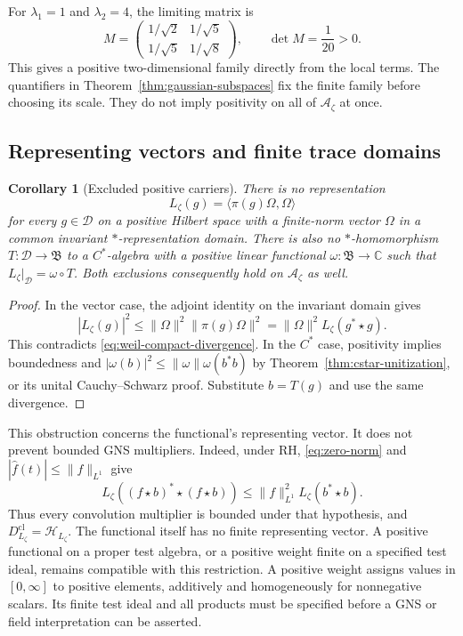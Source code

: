 \documentclass[11pt]{article}
\newtheorem{corollary}[theorem]{Corollary}
\theoremstyle{definition}
\theoremstyle{remark}
\numberwithin{equation}{section}
\newcommand{\cA}{\mathcal A}
\newcommand{\C}{\mathbb C}
\begin{document}
For $\lambda_1=1$ and $\lambda_2=4$, the limiting matrix is
\[
 M=\begin{pmatrix}1/\sqrt2&1/\sqrt5\\1/\sqrt5&1/\sqrt8\end{pmatrix},
 \qquad\det M=\frac1{20}>0.
\]
This gives a positive two-dimensional family directly from the local terms.
The quantifiers in Theorem~\ref{thm:gaussian-subspaces} fix the finite family
before choosing its scale.  They do not imply positivity on all of
$\cA_\zeta$ at once.

\subsection{Representing vectors and finite trace domains}

\begin{corollary}[Excluded positive carriers]
\label{cor:weil-carriers}
There is no representation
\[
 L_\zeta(g)=\langle\pi(g)\Omega,\Omega\rangle
\]
for every $g\in\mathscr D$ on a positive Hilbert space with a finite-norm
vector $\Omega$ in a common invariant $*$-representation domain.
There is also no $*$-homomorphism $T:\mathscr D\to\mathfrak B$ to a
$C^*$-algebra with a positive linear functional
$\omega:\mathfrak B\to\C$ such that $L_\zeta|_{\mathscr D}=\omega\circ T$.
Both exclusions consequently hold on $\cA_\zeta$ as well.
\end{corollary}

\begin{proof}
In the vector case, the adjoint identity on the invariant domain gives
\[
 |L_\zeta(g)|^2
 \leq\|\Omega\|^2\|\pi(g)\Omega\|^2
 =\|\Omega\|^2L_\zeta(g^*\star g).
\]
This contradicts \eqref{eq:weil-compact-divergence}.
In the $C^*$ case, positivity implies boundedness and
$|\omega(b)|^2\leq\|\omega\|\omega(b^*b)$ by
Theorem~\ref{thm:cstar-unitization}, or its unital Cauchy--Schwarz proof.
Substitute $b=T(g)$ and use the same divergence.
\end{proof}

This obstruction concerns the functional's representing vector.
It does not prevent bounded GNS multipliers.  Indeed, under RH,
\eqref{eq:zero-norm} and $|\widehat f(t)|\leq\|f\|_{L^1}$ give
\[
 L_\zeta((f\star b)^*\star(f\star b))
 \leq\|f\|_{L^1}^2 L_\zeta(b^*\star b).
\]
Thus every convolution multiplier is bounded under that hypothesis,
and $D_{L_\zeta}^{\mathrm{cl}}=\mathcal H_{L_\zeta}$.
The functional itself has no finite representing vector.
A positive functional on a proper test algebra, or a positive weight
finite on a specified test ideal, remains compatible with this restriction.
A positive weight assigns values in $[0,\infty]$ to positive elements,
additively and homogeneously for nonnegative scalars.  Its finite test
ideal and all products must be specified before a GNS or field
interpretation can be asserted.
\end{document}
